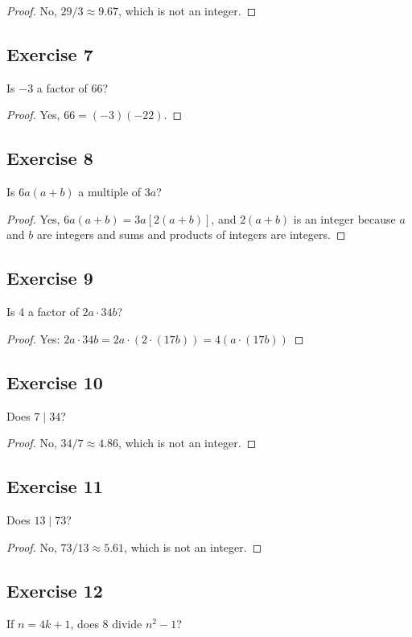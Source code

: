 \documentclass[14pt]{extarticle}
\begin{document}
\begin{proof}
No, $29/3 \approx 9.67$, which is not an integer.
\end{proof}

\subsection{Exercise 7}
Is $-3$ a factor of 66?

\begin{proof}
Yes, $66 = (-3)(-22)$.
\end{proof}

\subsection{Exercise 8}
Is $6a(a + b)$ a multiple of $3a$?

\begin{proof}
Yes, $6a(a + b) = 3a[2(a + b)]$, and $2(a + b)$ is an integer because $a$ and $b$ are integers and sums and products of integers are integers.
\end{proof}

\subsection{Exercise 9}
Is 4 a factor of $2a\cdot 34b$?

\begin{proof}
Yes: $2a\cdot 34b = 2a \cdot (2\cdot(17b)) = 4(a\cdot(17b))$
\end{proof}

\subsection{Exercise 10}
Does $7 \mid 34$?

\begin{proof}
No, $34/7 \approx 4.86$, which is not an integer.
\end{proof}

\subsection{Exercise 11}
Does $13 \mid 73$?

\begin{proof}
No, $73/13 \approx 5.61$, which is not an integer.
\end{proof}

\subsection{Exercise 12}
If $n = 4k + 1$, does 8 divide $n^2 - 1$?
\end{document}
